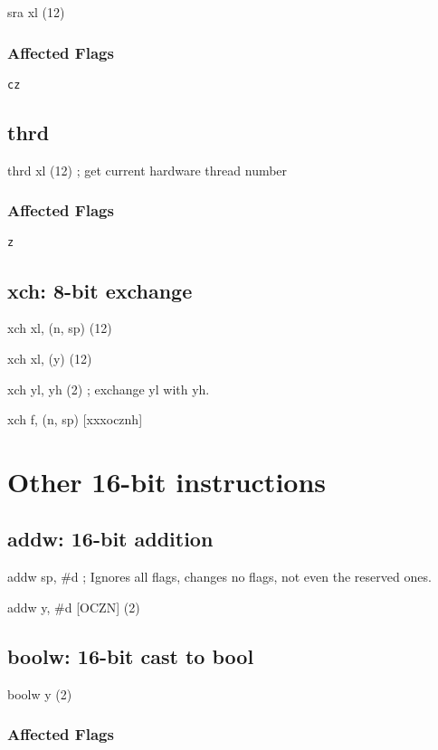 \documentclass{book}
\begin{document}
sra xl (12)

\subsubsection*{Affected Flags}

\texttt{cz}


\subsection{thrd}

thrd xl (12) ; get current hardware thread number

\subsubsection*{Affected Flags}

\texttt{z}


\subsection{xch: 8-bit exchange}

xch xl, (n, sp) (12)

xch xl, (y) (12)

xch yl, yh (2)            ; exchange yl with yh.

xch f, (n, sp) [xxxocznh]

\section{Other 16-bit instructions}

\subsection{addw: 16-bit addition}

addw sp, \#d            ; Ignores all flags, changes no flags, not even the reserved ones.

addw y, \#d [OCZN] (2)


\subsection{boolw: 16-bit cast to bool}

boolw y (2)

\subsubsection*{Affected Flags}
\end{document}
